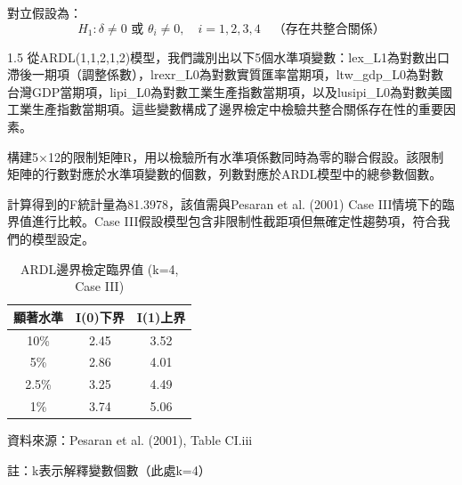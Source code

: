 \documentclass[a4paper,12pt]{article}
\begin{document}
\vspace{-0.3cm}

對立假設為：
\begin{equation}
H_1: \delta \neq 0 \text{ 或 } \theta_i \neq 0, \quad i = 1,2,3,4 \quad \text{（存在共整合關係）}
\end{equation}

\begin{spacing}{1.5}
從ARDL(1,1,2,1,2)模型，我們識別出以下5個水準項變數：lex\_L1為對數出口滯後一期項（調整係數），lrexr\_L0為對數實質匯率當期項，ltw\_gdp\_L0為對數台灣GDP當期項，lipi\_L0為對數工業生產指數當期項，以及lusipi\_L0為對數美國工業生產指數當期項。這些變數構成了邊界檢定中檢驗共整合關係存在性的重要因素。

構建5×12的限制矩陣R，用以檢驗所有水準項係數同時為零的聯合假設。該限制矩陣的行數對應於水準項變數的個數，列數對應於ARDL模型中的總參數個數。

計算得到的F統計量為81.3978，該值需與Pesaran et al. (2001) Case III情境下的臨界值進行比較。Case III假設模型包含非限制性截距項但無確定性趨勢項，符合我們的模型設定。
\end{spacing}
\vspace{-0.5cm}
\begin{table}[h!]
  \centering
  \begin{threeparttable}
    \caption{ARDL邊界檢定臨界值 (k=4, Case III)}
    \label{tab:critical_values}
    \begin{tabular}{ccc}
      \toprule
      顯著水準 & I(0)下界 & I(1)上界 \\
      \midrule
      10\%   & 2.45     & 3.52     \\
      5\%    & 2.86     & 4.01     \\
      2.5\%  & 3.25     & 4.49     \\
      1\%    & 3.74     & 5.06     \\
      \bottomrule
    \end{tabular}
    \begin{tablenotes}
      \footnotesize
      \item 資料來源：Pesaran et al. (2001), Table CI.iii
      \item 註：k表示解釋變數個數（此處k=4）
    \end{tablenotes}
  \end{threeparttable}
\end{table}
\vspace{-0.5cm}
\end{document}
